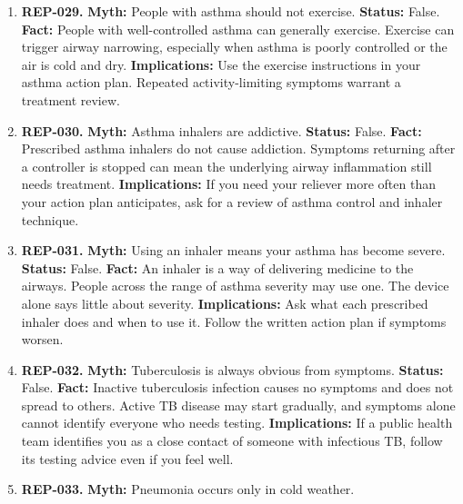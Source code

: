 \documentclass[11pt,oneside]{book}
\begin{document}
\begin{enumerate}[leftmargin=0pt,labelwidth=0pt,labelsep=0pt,itemindent=0pt]
\item[] \textbf{REP-029.} \textbf{Myth:} People with asthma should not exercise.\newline
\textbf{Status:} False.\newline
\textbf{Fact:} People with well-controlled asthma can generally exercise. Exercise can trigger airway narrowing, especially when asthma is poorly controlled or the air is cold and dry. \cite{ref179}\newline
\textbf{Implications:} Use the exercise instructions in your asthma action plan. Repeated activity-limiting symptoms warrant a treatment review.
\item[] \textbf{REP-030.} \textbf{Myth:} Asthma inhalers are addictive.\newline
\textbf{Status:} False.\newline
\textbf{Fact:} Prescribed asthma inhalers do not cause addiction. Symptoms returning after a controller is stopped can mean the underlying airway inflammation still needs treatment. \cite{ref179}\newline
\textbf{Implications:} If you need your reliever more often than your action plan anticipates, ask for a review of asthma control and inhaler technique.
\item[] \textbf{REP-031.} \textbf{Myth:} Using an inhaler means your asthma has become severe.\newline
\textbf{Status:} False.\newline
\textbf{Fact:} An inhaler is a way of delivering medicine to the airways. People across the range of asthma severity may use one. The device alone says little about severity. \cite{ref179}\newline
\textbf{Implications:} Ask what each prescribed inhaler does and when to use it. Follow the written action plan if symptoms worsen.
\item[] \textbf{REP-032.} \textbf{Myth:} Tuberculosis is always obvious from symptoms.\newline
\textbf{Status:} False.\newline
\textbf{Fact:} Inactive tuberculosis infection causes no symptoms and does not spread to others. Active TB disease may start gradually, and symptoms alone cannot identify everyone who needs testing. \cite{ref177}\newline
\textbf{Implications:} If a public health team identifies you as a close contact of someone with infectious TB, follow its testing advice even if you feel well.
\item[] \textbf{REP-033.} \textbf{Myth:} Pneumonia occurs only in cold weather.\newline

\end{enumerate}
\end{document}
